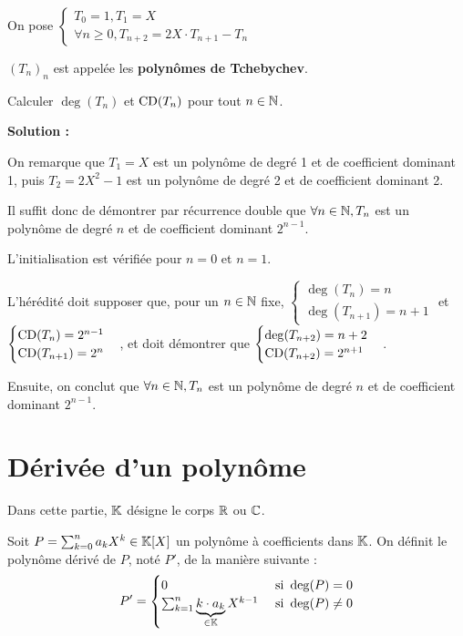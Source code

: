\documentclass[12pt, a4paper]{report}
\begin{document}
\begin{exercise}
    On pose $\begin{cases}
    T_0 = 1, T_1 = X\\
    \forall n \ge 0, T_{n+2} = 2X \cdot T_{n+1} - T_n
    \end{cases}$

    $(T_n)_n$ est appelée les \textbf{polynômes de Tchebychev}.

    Calculer $\deg(T_n)$ et $\mathrm{CD}(T_n)$ pour tout $n \in \mathbb{N}$.

    \textbf{Solution :}

    On remarque que $T_1 = X$ est un polynôme de degré 1 et de coefficient dominant 1, puis $T_2 = 2X^2 - 1$ est un polynôme de degré 2 et de coefficient dominant 2.
    
    Il suffit donc de démontrer par récurrence double que $\forall n \in \mathbb{N}, T_n$ est un polynôme de degré $n$ et de coefficient dominant $2^{n-1}$.

    L'initialisation est vérifiée pour $n=0$ et $n=1$.

    L'hérédité doit supposer que, pour un $n \in \mathbb{N}$ fixe, $\begin{cases} \deg(T_n) = n \\ \deg(T_{n+1}) = n+1\end{cases}$ et $\begin{cases} \mathrm{CD}(T_n) = 2^{n-1} \\ \mathrm{CD}(T_{n+1}) = 2^n\end{cases}$, et doit démontrer que $\begin{cases} \deg(T_{n+2}) = n+2 \\ \mathrm{CD}(T_{n+2}) = 2^{n+1}\end{cases}$.

    Ensuite, on conclut que $\forall n \in \mathbb{N}, T_n$ est un polynôme de degré $n$ et de coefficient dominant $2^{n-1}$.
\end{exercise}

\section{Dérivée d'un polynôme}

\begin{importantbox}
    Dans cette partie, $\mathbb{K}$ désigne le corps $\mathbb{R}$ ou $\mathbb{C}$.
\end{importantbox}

\begin{definition}
    Soit $P = \sum_{k=0}^{n}a_k X^k \in \mathbb{K}[X]$ un polynôme à coefficients dans $\mathbb{K}$. On définit le polynôme dérivé de $P$, noté $P'$, de la manière suivante :
    $$P' = \begin{cases}
    0 & \text{ si } \deg(P) = 0\\
    \sum_{k=1}^{n} \underbrace{k \cdot a_k}_{\in \mathbb{K}} X^{k-1} & \text{ si } \deg(P) \ne 0
    \end{cases}$$
\end{definition}
\end{document}
